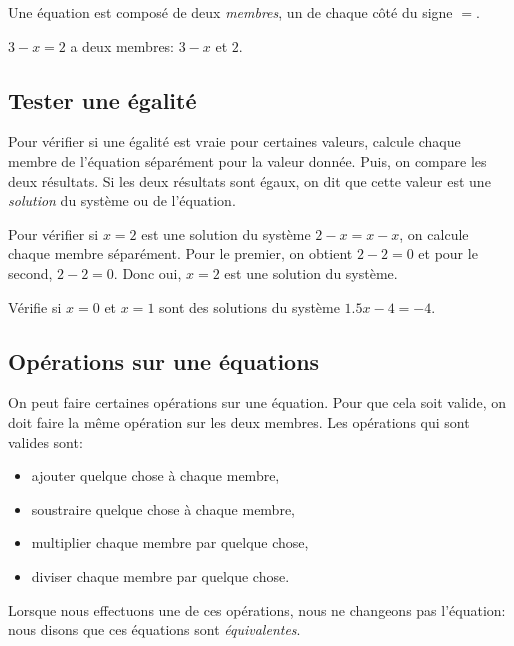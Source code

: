 \begin{definition}
    Une équation est composé de deux \emph{membres}, un de chaque côté du signe $=$.
\end{definition}
\begin{exemple}
    $3-x=2$ a deux membres: $3-x$ et $2$.
\end{exemple}

\subsection{Tester une égalité}

Pour vérifier si une égalité est vraie pour certaines valeurs, calcule chaque membre de l'équation séparément pour la valeur donnée. Puis, on compare les deux résultats. Si les deux résultats sont égaux, on dit que cette valeur est une \emph{solution} du système ou de l'équation.

\begin{exemple}
    Pour vérifier si $x=2$ est une solution du système $2 - x = x - x$, on calcule chaque membre séparément. Pour le premier, on obtient $2 - 2 = 0$ et pour le second, $2 - 2 = 0$. Donc oui, $x = 2$ est une solution du système.
\end{exemple}

\begin{exercice}
    Vérifie si $x = 0$ et $x = 1$ sont des solutions du système $1.5x - 4 = -4$.
\end{exercice}

\subsection{Opérations sur une équations}

On peut faire certaines opérations sur une équation. Pour que cela soit valide, on doit faire la même opération sur les deux membres. Les opérations qui sont valides sont:
\begin{itemize}
    \item ajouter quelque chose à chaque membre,
    \item soustraire quelque chose à chaque membre,
    \item multiplier chaque membre par quelque chose,
    \item diviser chaque membre par quelque chose.
\end{itemize}

Lorsque nous effectuons une de ces opérations, nous ne changeons pas l'équation: nous disons que ces équations sont \emph{équivalentes}.

